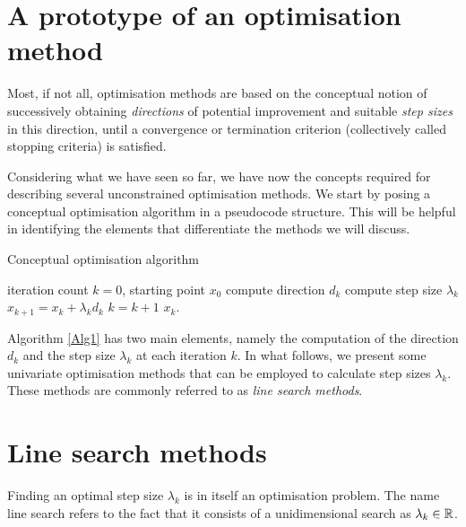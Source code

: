 
\section{A prototype of an optimisation method}

Most, if not all, optimisation methods are based on the conceptual notion of successively obtaining \emph{directions} of potential improvement and suitable \emph{step sizes} in this direction, until a convergence or termination criterion (collectively called stopping criteria) is satisfied.

Considering what we have seen so far, we have now the concepts required for describing several unconstrained optimisation methods. We start by posing a conceptual optimisation algorithm in a pseudocode structure. This will be helpful in identifying the elements that differentiate the methods we will discuss.

\begin{algorithm}[H]
\caption{Conceptual optimisation algorithm} \label{Alg1}
\begin{algorithmic}[1] %
 iteration count $k = 0$, starting point $x_0$ 
\State compute direction $d_k$ 
\State compute step size $\lambda_k $ %
\State $x_{k+1} = x_k + \lambda_k d_k$
\State $k = k+1$
\EndWhile
{} $x_k$.
\end{algorithmic}
\end{algorithm}

Algorithm \ref{Alg1} has two main elements, namely the computation of the direction $d_k$ and the step size $\lambda_k$ at each iteration $k$. In what follows, we present some univariate optimisation methods that can be employed to calculate step sizes $\lambda_k$. These methods are commonly referred to as \emph{line search methods}.

\section{Line search methods}

Finding an optimal step size $\lambda_k$ is in itself an optimisation problem. The name line search refers to the fact that it consists of a unidimensional search as $\lambda_k \in \mathbb{R}$. 

